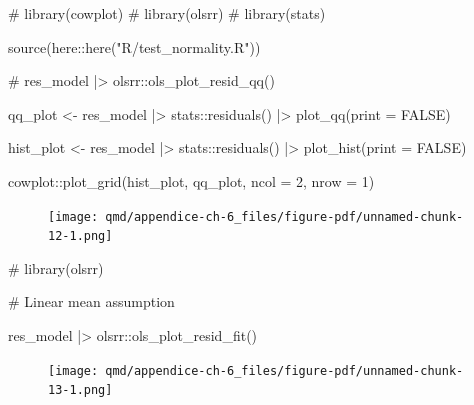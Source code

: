 \documentclass[
  12pt,
  a4paper,
  oneside]{tesesusp}
\newenvironment{Shaded}{\begin{snugshade}}{\end{snugshade}}
\newcommand{\AttributeTok}[1]{\textcolor[rgb]{0.40,0.45,0.13}{#1}}
\newcommand{\CommentTok}[1]{\textcolor[rgb]{0.37,0.37,0.37}{#1}}
\newcommand{\ConstantTok}[1]{\textcolor[rgb]{0.56,0.35,0.01}{#1}}
\newcommand{\DecValTok}[1]{\textcolor[rgb]{0.68,0.00,0.00}{#1}}
\newcommand{\FunctionTok}[1]{\textcolor[rgb]{0.28,0.35,0.67}{#1}}
\newcommand{\NormalTok}[1]{\textcolor[rgb]{0.00,0.23,0.31}{#1}}
\newcommand{\OtherTok}[1]{\textcolor[rgb]{0.00,0.23,0.31}{#1}}
\newcommand{\SpecialCharTok}[1]{\textcolor[rgb]{0.37,0.37,0.37}{#1}}
\newcommand{\StringTok}[1]{\textcolor[rgb]{0.13,0.47,0.30}{#1}}
\begin{document}
\begin{Shaded}
\begin{Highlighting}[numbers=left,,]
\CommentTok{\# library(cowplot)}
\CommentTok{\# library(olsrr)}
\CommentTok{\# library(stats)}

\FunctionTok{source}\NormalTok{(here}\SpecialCharTok{::}\FunctionTok{here}\NormalTok{(}\StringTok{"R/test\_normality.R"}\NormalTok{))}

\CommentTok{\# res\_model |\textgreater{} olsrr::ols\_plot\_resid\_qq()}

\NormalTok{qq\_plot }\OtherTok{\textless{}{-}}\NormalTok{ res\_model }\SpecialCharTok{|\textgreater{}} 
\NormalTok{  stats}\SpecialCharTok{::}\FunctionTok{residuals}\NormalTok{() }\SpecialCharTok{|\textgreater{}}
  \FunctionTok{plot\_qq}\NormalTok{(}\AttributeTok{print =} \ConstantTok{FALSE}\NormalTok{)}

\NormalTok{hist\_plot }\OtherTok{\textless{}{-}}\NormalTok{ res\_model }\SpecialCharTok{|\textgreater{}}
\NormalTok{  stats}\SpecialCharTok{::}\FunctionTok{residuals}\NormalTok{() }\SpecialCharTok{|\textgreater{}}
  \FunctionTok{plot\_hist}\NormalTok{(}\AttributeTok{print =} \ConstantTok{FALSE}\NormalTok{)}

\NormalTok{cowplot}\SpecialCharTok{::}\FunctionTok{plot\_grid}\NormalTok{(hist\_plot, qq\_plot, }\AttributeTok{ncol =} \DecValTok{2}\NormalTok{, }\AttributeTok{nrow =} \DecValTok{1}\NormalTok{)}
\end{Highlighting}
\end{Shaded}

\begin{figure}[H]

{\centering \texttt{[image: qmd/appendice-ch-6\_files/figure-pdf/unnamed-chunk-12-1.png]}

}

\end{figure}

\begin{Shaded}
\begin{Highlighting}[numbers=left,,]
\CommentTok{\# library(olsrr)}

\CommentTok{\# Linear mean assumption}

\NormalTok{res\_model }\SpecialCharTok{|\textgreater{}}\NormalTok{ olsrr}\SpecialCharTok{::}\FunctionTok{ols\_plot\_resid\_fit}\NormalTok{()}
\end{Highlighting}
\end{Shaded}

\begin{figure}[H]

{\centering \texttt{[image: qmd/appendice-ch-6\_files/figure-pdf/unnamed-chunk-13-1.png]}

}

\end{figure}
\end{document}
